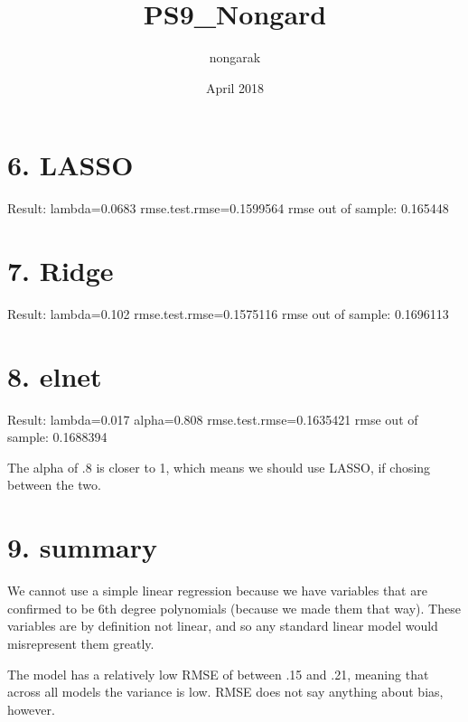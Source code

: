 \documentclass{article}
\title{PS9_Nongard}
\author{nongarak }
\date{April 2018}
\begin{document}
\maketitle

\section{6. LASSO}

Result: lambda=0.0683
rmse.test.rmse=0.1599564
rmse out of sample: 0.165448

\section{7. Ridge}

Result: lambda=0.102
rmse.test.rmse=0.1575116
rmse out of sample: 0.1696113

\section{8. elnet}

Result: lambda=0.017
alpha=0.808
rmse.test.rmse=0.1635421
rmse out of sample: 0.1688394

The alpha of .8 is closer to 1, which means we should use LASSO, if chosing between the two. 

\section{9. summary}

We cannot use a simple linear regression because we have variables that are confirmed to be 6th degree polynomials (because we made them that way). These variables are by definition not linear, and so any standard linear model would misrepresent them greatly. 

The model has a relatively low RMSE of between .15 and .21, meaning that across all models the variance is low. RMSE does not say anything about bias, however.  
\end{document}
